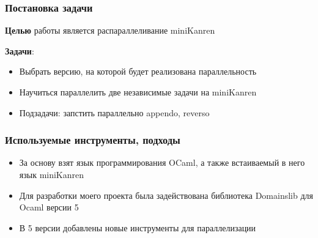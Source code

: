 \documentclass{beamer}
\begin{document}
\begin{frame}
  \frametitle{Постановка задачи}
  \textbf{Целью} работы является распараллеливание miniKanren %

  \textbf{Задачи}:
  \begin{itemize}
    \item Выбрать версию, на которой будет реализована параллельность 
    \item Научиться параллелить две независимые задачи на miniKanren
    \item Подзадачи: запстить параллельно appendo, reverso
  \end{itemize}
\end{frame}




\begin{frame}
  \frametitle{Используемые инструменты, подходы}
  \begin{itemize}
    \item За основу взят язык программирования OCaml, а также встаиваемый в него язык miniKanren
    \item Для разработки моего проекта была задействована библиотека Domainslib для Ocaml версии 5
    \item В 5 версии добавлены новые инструменты для параллелизации 
  \end{itemize}

\end{frame}

\end{document}
